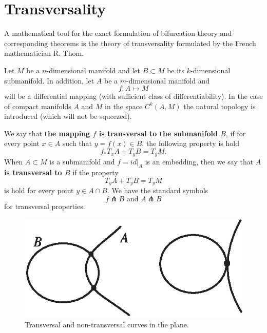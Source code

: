 \section{Transversality}

A mathematical tool for the exact formulation of bifurcation theory and corresponding theorems is the theory of transversality formulated by the French mathematician R. Thom.

Let $M$ be a $n$-dimensional manifold and let $B\subset M$ be its $k$-dimensional submanifold. In addition, let $A$ be a $m$-dimensional manifold and 
$$
f:A\longmapsto M
$$
will be a differential mapping (with sufficient class of differentiability). In the case of compact manifolds $A$ and $M$ in the space $C^{k}(A,M)$ the natural topology is introduced (which will not be squeezed).
 
 \begin{definition}
 	We say that \textbf{the mapping $f$ is transversal to the submanifold $B$}, if for every point $x\in A$ such that $y = f (x) \in B$, the following property is hold
 	$$
 	f_{\ast }T_{x}A+T_{y}B=T_{y}M.
 	$$
 	When $A\subset M$ is a submanifold and $f=id|_{A}$ is an embedding, then we say that \textbf{$A$ is transversal to $B$} if the property
 	$$
 	T_{y}A+T_{y}B=T_{y}M
 	$$
 	is hold for every point $y\in A\cap B$. We have the standard symbols
 	$$
 	f\pitchfork B\text{ \ \ and \ \ }A\pitchfork B
 	$$
 	for transversal properties.
 \end{definition}

\begin{figure}[!ht]
	\centering
	\includegraphics [scale=1]{jtr36}
	\caption{Transversal and non-transversal curves in the plane.}
	\label{fig:3.6}
\end{figure}

